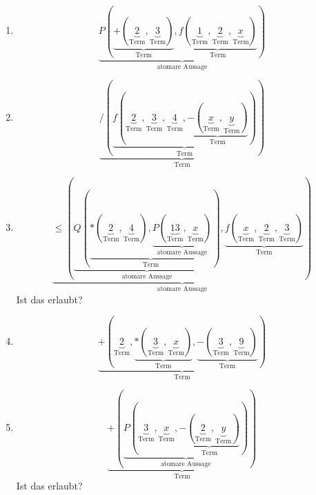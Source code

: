 \documentclass[a4paper]{article}
\begin{document}
\begin{enumerate}
\begin{enumerate}
			\item
			\begin{equation*}
				\underbrace{P(\underbrace{+(\underbrace{2}_{\text{Term}}, \underbrace{3}_{\text{Term}})}_{\text{Term}}, \underbrace{f(\underbrace{1}_{\text{Term}}, \underbrace{2}_{\text{Term}}, \underbrace{x}_{\text{Term}})}_{\text{Term}})}_{\text{atomare Aussage}}
			\end{equation*}
			
			\item
			\begin{equation*}
				\underbrace{/(\underbrace{f(\underbrace{2}_{\text{Term}}, \underbrace{3}_{\text{Term}}, \underbrace{4}_{\text{Term}}, \underbrace{-(\underbrace{x}_{\text{Term}}, \underbrace{y}_{\text{Term}})}_{\text{Term}})}_{\text{Term}})}_{\text{Term}}
			\end{equation*}
			
			\item
			\begin{equation*}
				\underbrace{\leq(\underbrace{Q(\underbrace{*(\underbrace{2}_{\text{Term}}, \underbrace{4}_{\text{Term}}), \underbrace{P(\underbrace{13}_{\text{Term}}, \underbrace{x}_{\text{Term}})}_{\text{atomare Aussage}}}_{\text{Term}})}_{\text{atomare Aussage}}, \underbrace{f(\underbrace{x}_{\text{Term}}, \underbrace{2}_{\text{Term}}, \underbrace{3}_{\text{Term}})}_{\text{Term}})}_{\text{atomare Aussage}}
			\end{equation*}
			\newline
			Ist das erlaubt?
			
			\item
			\begin{equation*}
				\underbrace{+(\underbrace{2}_{\text{Term}}, \underbrace{*(\underbrace{3}_{\text{Term}}, \underbrace{x}_{\text{Term}})}_{\text{Term}}, \underbrace{-(\underbrace{3}_{\text{Term}}, \underbrace{9}_{\text{Term}})}_{\text{Term}})}_{\text{Term}}
			\end{equation*}
			
			\item
			\begin{equation*}
				\underbrace{+(\underbrace{P(\underbrace{3}_{\text{Term}}, \underbrace{x}_{\text{Term}}, \underbrace{-(\underbrace{2}_{\text{Term}}, \underbrace{y}_{\text{Term}})}_{\text{Term}})}_{\text{atomare Aussage}})}_{\text{Term}}
			\end{equation*}
			\newline
			Ist das erlaubt?
		\end{enumerate}
		

\end{enumerate}
\end{document}
